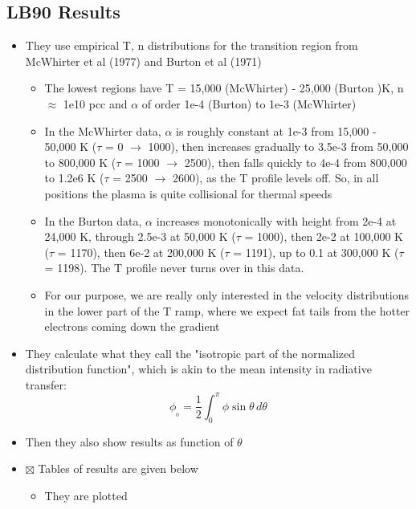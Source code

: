 \documentclass[11pt]{article}
\begin{document}
\subsection{LB90 Results}
\label{sec:orgheadline16}
\begin{itemize}
\item They use empirical T, n distributions for the transition region from McWhirter et al (1977) and Burton et al (1971)
\begin{itemize}
\item The lowest regions have T = 15,000 (McWhirter) - 25,000 (Burton )K, n \(\approx\) 1e10 pcc and \(\alpha\) of order 1e-4 (Burton) to 1e-3 (McWhirter)
\item In the McWhirter data, \(\alpha\) is roughly constant at 1e-3 from 15,000 - 50,000 K (\(\tau\) = 0 \(\to\) 1000), then increases gradually to 3.5e-3 from 50,000 to 800,000 K (\(\tau\) = 1000 \(\to\) 2500), then falls quickly to 4e-4 from 800,000 to 1.2e6 K (\(\tau\) = 2500 \(\to\) 2600), as the T profile levels off.  So, in all positions the plasma is quite collisional for thermal speeds
\item In the Burton data, \(\alpha\) increases monotonically with height from 2e-4 at 24,000 K, through 2.5e-3 at 50,000 K (\(\tau\) = 1000), then 2e-2 at 100,000 K (\(\tau\) = 1170), then 6e-2 at 200,000 K (\(\tau\) = 1191), up to 0.1 at 300,000 K (\(\tau\) = 1198).  The T profile never turns over in this data.
\item For our purpose, we are really only interested in the velocity distributions in the lower part of the T ramp, where we expect fat tails from the hotter electrons coming down the gradient
\end{itemize}
\item They calculate what they call the "isotropic part of the normalized distribution function", which is akin to the mean intensity in radiative transfer: \[\phi_{_{0}} = \frac12 \int_{0}^{\pi} \phi \sin\theta\, d\theta\]
\item Then they also show results as function of \(\theta\)
\item $\boxtimes$ Tables of results are given below
\begin{itemize}
\item They are plotted
\end{itemize}
\end{itemize}
\end{document}
